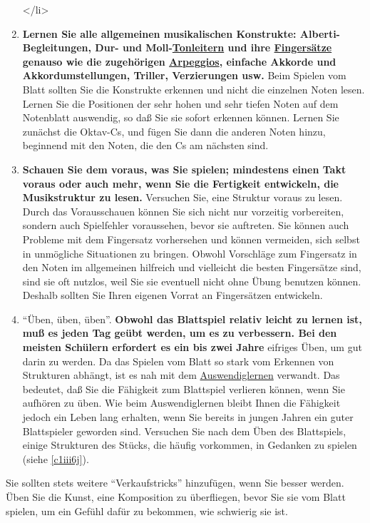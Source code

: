 \begin{enumerate}[label={\arabic*.}]
</li>
\item \textbf{Lernen Sie alle allgemeinen musikalischen Konstrukte: Alberti-Begleitungen, Dur- und Moll-\hyperref[c1iii5]{Tonleitern} und ihre \hyperref[table]{Fingersätze} genauso wie die zugehörigen \hyperref[Arpeggios]{Arpeggios}, einfache Akkorde und Akkordumstellungen, Triller, Verzierungen usw.}
Beim Spielen vom Blatt sollten Sie die Konstrukte erkennen und nicht die einzelnen Noten lesen.
Lernen Sie die Positionen der sehr hohen und sehr tiefen Noten auf dem Notenblatt auswendig, so daß Sie sie sofort erkennen können.
Lernen Sie zunächst die Oktav-Cs, und fügen Sie dann die anderen Noten hinzu, beginnend mit den Noten, die den Cs am nächsten sind.


\item \textbf{Schauen Sie dem voraus, was Sie spielen; mindestens einen Takt voraus oder auch mehr, wenn Sie die Fertigkeit entwickeln, die Musikstruktur zu lesen.}
Versuchen Sie, eine Struktur voraus zu lesen.
Durch das Vorausschauen können Sie sich nicht nur vorzeitig vorbereiten, sondern auch Spielfehler voraussehen, bevor sie auftreten.
Sie können auch Probleme mit dem Fingersatz vorhersehen und können vermeiden, sich selbst in unmögliche Situationen zu bringen.
Obwohl Vorschläge zum Fingersatz in den Noten im allgemeinen hilfreich und vielleicht die besten Fingersätze sind, sind sie oft nutzlos, weil Sie sie eventuell nicht ohne Übung benutzen können.
Deshalb sollten Sie Ihren eigenen Vorrat an Fingersätzen entwickeln.


\item \enquote{Üben, üben, üben}.
\textbf{Obwohl das Blattspiel relativ leicht zu lernen ist, muß es jeden Tag geübt werden, um es zu verbessern.
Bei den meisten Schülern erfordert es ein bis zwei Jahre} eifriges Üben, um gut darin zu werden.
Da das Spielen vom Blatt so stark vom Erkennen von Strukturen abhängt, ist es nah mit dem \hyperref[c1iii6]{Auswendiglernen} verwandt.
Das bedeutet, daß Sie die Fähigkeit zum Blattspiel verlieren können, wenn Sie aufhören zu üben.
Wie beim Auswendiglernen bleibt Ihnen die Fähigkeit jedoch ein Leben lang erhalten, wenn Sie bereits in jungen Jahren ein guter Blattspieler geworden sind.
Versuchen Sie nach dem Üben des Blattspiels, einige Strukturen des Stücks, die häufig vorkommen, in Gedanken zu spielen (siehe \hyperref[c1iii6j]{\autoref{c1iii6j}}).


\end{enumerate}
Sie sollten stets weitere \enquote{Verkaufstricks} hinzufügen, wenn Sie besser werden.
Üben Sie die Kunst, eine Komposition zu überfliegen, bevor Sie sie vom Blatt spielen, um ein Gefühl dafür zu bekommen, wie schwierig sie ist.

